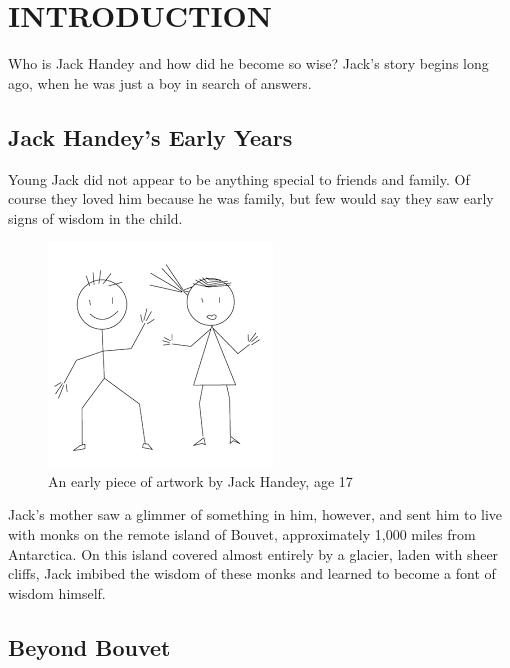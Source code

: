 \chapter{INTRODUCTION} \label{ch:introduction}%

Who is Jack Handey and how did he become so wise?  Jack's story begins long ago, when he was just a boy in search of answers.  

\section{Jack Handey's Early Years} \label{sec:Jack Early Years} %

Young Jack did not appear to be anything special to friends and family.  Of course they loved him because he was family, but few would say they saw early signs of wisdom in the child.  

\begin{figure}[tbph]
\centering
\includegraphics[width=.5\linewidth]{./fig/Dissertation_Image.png} %
\caption{An early piece of artwork by Jack Handey, age 17}
\label{fig:JackArt}
\end{figure} 

Jack's mother saw a glimmer of something in him, however, and sent him to live with monks on the remote island of Bouvet, approximately 1,000 miles from Antarctica.  On this island covered almost entirely by a glacier, laden with sheer cliffs, Jack imbibed the wisdom of these monks and learned to become a font of wisdom himself.

\section{Beyond Bouvet} \label{sec:Beyond Bouvet} %
 
